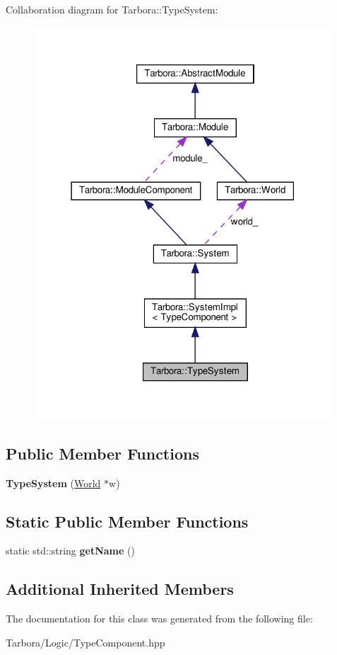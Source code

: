 Collaboration diagram for Tarbora\+:\+:Type\+System\+:
\nopagebreak
\begin{figure}[H]
\begin{center}
\leavevmode
\includegraphics[width=316pt]{classTarbora_1_1TypeSystem__coll__graph}
\end{center}
\end{figure}
\subsection*{Public Member Functions}
\begin{DoxyCompactItemize}
\item 
\mbox{\label{classTarbora_1_1TypeSystem_aa3cb6ff5e3c3f1e7dacd63618f5a7c7f}} 
{\bfseries Type\+System} (\hyperlink{classTarbora_1_1World}{World} $\ast$w)
\end{DoxyCompactItemize}
\subsection*{Static Public Member Functions}
\begin{DoxyCompactItemize}
\item 
\mbox{\label{classTarbora_1_1TypeSystem_a30fa8ae0e76471af4fc510468a12fb71}} 
static std\+::string {\bfseries get\+Name} ()
\end{DoxyCompactItemize}
\subsection*{Additional Inherited Members}


The documentation for this class was generated from the following file\+:\begin{DoxyCompactItemize}
\item 
Tarbora/\+Logic/Type\+Component.\+hpp\end{DoxyCompactItemize}

